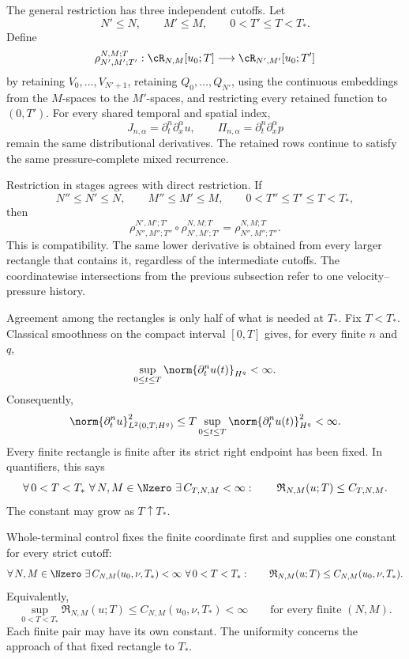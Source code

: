 The general restriction has three independent cutoffs.
Let
\[
  N'\leq N,
  \qquad
  M'\leq M,
  \qquad
  0<T'\leq T<T_*.
\]
Define
\[
  \rho_{N',M';T'}^{N,M;T}:
  \cR_{N,M}[u_0;T]
  \longrightarrow
  \cR_{N',M'}[u_0;T']
\]
by retaining \(V_0,\ldots,V_{N'+1}\), retaining \(Q_0,\ldots,Q_{N'}\), using the continuous embeddings from the \(M\)-spaces to the \(M'\)-spaces, and restricting every retained function to \((0,T')\).
For every shared temporal and spatial index,
\[
  J_{n,\alpha}
  =
  \partial_t^n\partial_x^\alpha u,
  \qquad
  \Pi_{n,\alpha}
  =
  \partial_t^n\partial_x^\alpha p
\]
remain the same distributional derivatives.
The retained rows continue to satisfy the same pressure-complete mixed recurrence.

Restriction in stages agrees with direct restriction.
If
\[
  N''\leq N'\leq N,
  \qquad
  M''\leq M'\leq M,
  \qquad
  0<T''\leq T'\leq T<T_*,
\]
then
\[
  \rho_{N'',M'';T''}^{N',M';T'}
  \circ
  \rho_{N',M';T'}^{N,M;T}
  =
  \rho_{N'',M'';T''}^{N,M;T}.
\]
This is compatibility.
The same lower derivative is obtained from every larger rectangle that contains it, regardless of the intermediate cutoffs.
The coordinatewise intersections from the previous subsection refer to one velocity--pressure history.

Agreement among the rectangles is only half of what is needed at \(T_*\).
Fix \(T<T_*\).
Classical smoothness on the compact interval \([0,T]\) gives, for every finite \(n\) and \(q\),
\[
  \sup_{0\leq t\leq T}
  \norm{\partial_t^n u(t)}_{H^q}
  <
  \infty.
\]
Consequently,
\[
  \norm{\partial_t^n u}_{L^2(0,T;H^q)}^2
  \leq
  T
  \sup_{0\leq t\leq T}
  \norm{\partial_t^n u(t)}_{H^q}^2
  <
  \infty.
\]
Every finite rectangle is finite after its strict right endpoint has been fixed.
In quantifiers, this says
\[
  \forall\,0<T<T_*
  \ \forall\,N,M\in\Nzero
  \ \exists\,C_{T,N,M}<\infty:
  \qquad
  \mathfrak R_{N,M}(u;T)
  \leq
  C_{T,N,M}.
\]
The constant may grow as \(T\uparrow T_*\).

Whole-terminal control fixes the finite coordinate first and supplies one constant for every strict cutoff:
\[
  \forall\,N,M\in\Nzero
  \ \exists\,C_{N,M}(u_0,\nu,T_*)<\infty
  \ \forall\,0<T<T_*:
  \qquad
  \mathfrak R_{N,M}(u;T)
  \leq
  C_{N,M}(u_0,\nu,T_*).
\]
Equivalently,
\[
  \sup_{0<T<T_*}
  \mathfrak R_{N,M}(u;T)
  \leq
  C_{N,M}(u_0,\nu,T_*)
  <
  \infty
  \qquad
  \text{for every finite }(N,M).
\]
Each finite pair may have its own constant.
The uniformity concerns the approach of that fixed rectangle to \(T_*\).

